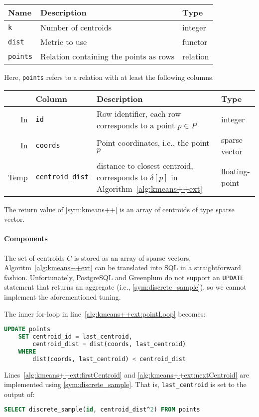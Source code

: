 \documentclass[letterpaper,11pt]{scrreprt}
\numberwithin{equation}{section}
\newcommand{\otoprule}{\midrule[\heavyrulewidth]}
\theoremstyle{algorithm}
\begin{document}
\begin{center}
	\begin{tabular}{lll}
		\toprule%
		\textbf{Name} & \textbf{Description} & \textbf{Type}
		\\\otoprule
		\texttt{k} &
		Number of centroids &
		integer
		\\\midrule
		\texttt{dist} &
		Metric to use &
		functor
		\\\midrule
		\texttt{points} &
		Relation containing the points as rows &
		relation
		\\\bottomrule
	\end{tabular}
\end{center}
%
Here, \texttt{points} refers to a relation with at least the following columns.
%
\begin{center}
	\begin{tabularx}{\linewidth}{rlXl}
		\toprule%
		& \textbf{Column} & \textbf{Description} & \textbf{Type}
		\\\otoprule
		In &
		\texttt{id} &
		Row identifier, each row corresponds to a point $p \in P$ &
		integer
		\\\midrule
		In &
		\texttt{coords} &
		Point coordinates, i.e., the point $p$ &
		sparse vector
		\\\midrule
		Temp &
		\texttt{centroid\_dist} &
		distance to closest centroid, corresponds to $\delta[p]$ in Algorithm~\ref{alg:kmeans++ext} &
		floating-point
		\\\bottomrule
	\end{tabularx}
\end{center}
%
The return value of \ref{sym:kmeans++} is an array of centroids of type sparse vector.

\paragraph{Components} The set of centroids $C$ is stored as an array of sparse vectors. Algoritm~\ref{alg:kmeans++ext} can be translated into SQL in a straightforward fashion. Unfortunately, PostgreSQL and Greenplum do not support an \texttt{UPDATE} statement that returns an aggregate (i.e., \ref{sym:discrete_sample}), so we cannot implement the aforementioned tuning.

The inner for-loop in line~\ref{alg:kmeans++ext:pointLoop} becomes:
\begin{lstlisting}[language=SQL]
	UPDATE points
	SET centroid_id = last_centroid,
	    centroid_dist = dist(coords, last_centroid)
	WHERE
	    dist(coords, last_centroid) < centroid_dist
\end{lstlisting}
Lines~\ref{alg:kmeans++ext:firstCentroid} and \ref{alg:kmeans++ext:nextCentroid} are implemented using \ref{sym:discrete_sample}. That is, \texttt{last\_centroid} is set to the output of:
\begin{lstlisting}[language=SQL]
	SELECT discrete_sample(id, centroid_dist^2) FROM points
\end{lstlisting}
\end{document}
